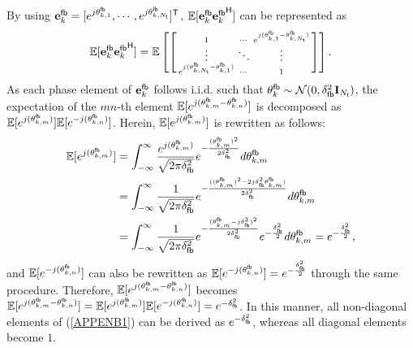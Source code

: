 \documentclass[draftclsnofoot, onecolumn, comsoc, 12pt]{IEEEtran}
\begin{document}
By using ${\mathbf{e}_{k}^{\sf{fb}}} = [e^{j\theta_{k,1}^{\sf{fb}}}, \cdots, e^{j\theta_{k, N_{{\sf{t}}}}^{\sf{fb}}}]^{\sf{T}}$, $\mathbb{E}[{\mathbf{e}_{k}^{\sf{fb}}}{\mathbf{e}_{k}^{\sf{fb}}}^{\sf{H}}]$ can be represented as
\begin{align} \label{APPENB1}
   \mathbb{E}[{\mathbf{e}_{k}^{\sf{fb}}}{\mathbf{e}_{k}^{\sf{fb}}}^{\sf{H}}] = \mathbb{E}\left[
   \left[\begin{smallmatrix}
   1&\cdots&e^{j(\theta_{k, 1}^{\sf{fb}}-\theta_{k, N_{{\sf{t}}}}^{\sf{fb}})} \\ 
   \vdots&\ddots&\vdots\\
   e^{j(\theta_{k, N_{{\sf{t}}}}^{\sf{fb}}-\theta_{k, 1}^{\sf{fb}})}&\cdots&1
   \end{smallmatrix}\right]
   \right].
\end{align}
As each phase element of ${\mathbf{e}_{k}^{\sf{fb}}}$ follows i.i.d. such that $\mathbf{\theta}_{k}^{\sf{fb}}\sim\mathcal{N}{(0,\delta_{\sf{fb}}^{2} \mathbf{I}_{N_{\sf{t}}})}$, the expectation of the $mn$-th element $\mathbb{E}[e^{j(\theta_{k, m}^{\sf{fb}}-\theta_{k, n}^{\sf{fb}})}]$ is decomposed as $\mathbb{E}[e^{j(\theta_{k, m}^{\sf{fb}})}]\mathbb{E}[e^{-j(\theta_{k, n}^{\sf{fb}})}]$. Herein, $\mathbb{E}[e^{j(\theta_{k, m}^{\sf{fb}})}]$ is rewritten as follows:
\begin{align} \label{APPENB2}
  \mathbb{E}[e^{j(\theta_{k, m}^{\sf{fb}})}] &= \int_{-\infty}^{\infty}{\frac{e^{j(\theta_{k, m}^{\sf{fb}})}}{\sqrt{2\pi\delta_{\sf{fb}}^{2}}}}{e^{-\frac{(\theta_{k, m}^{\sf{fb}})^2}{2\delta_{\sf{fb}}^{2}}}}{d\theta_{k, m}^{\sf{fb}}}  \\ 
  &= \int_{-\infty}^{\infty}{\frac{1}{\sqrt{2\pi\delta_{\sf{fb}}^{2}}}}{e^{-\frac{((\theta_{k, m}^{\sf{fb}})^2-2j\delta_{\sf{fb}}^{2}\theta_{k, m}^{\sf{fb}})}{2\delta_{\sf{fb}}^{2}}}}{d\theta_{k, m}^{\sf{fb}}} \nonumber \\
  &= \int_{-\infty}^{\infty}{\frac{1}{\sqrt{2\pi\delta_{\sf{fb}}^{2}}}}{e^{-\frac{(\theta_{k, m}^{\sf{fb}}-j\delta_{\sf{fb}}^{2})^2}{2\delta_{\sf{fb}}^{2}}}}{e^{-\frac{\delta_{\sf{fb}}^{2}}{2}}}{d\theta_{k, m}^{\sf{fb}}} = {e^{-\frac{\delta_{\sf{fb}}^{2}}{2}}},\nonumber
\end{align}
and $\mathbb{E}[e^{-j(\theta_{k, n}^{\sf{fb}})}]$ can also be rewritten as $\mathbb{E}[e^{-j(\theta_{k, n}^{\sf{fb}})}]=e^{-\frac{\delta_{\sf{fb}}^{2}}{2}}$ through the same procedure. 
Therefore, $\mathbb{E}[e^{j(\theta_{k, m}^{\sf{fb}}-\theta_{k, n}^{\sf{fb}})}]$ becomes $\mathbb{E}[e^{j(\theta_{k, m}^{\sf{fb}}-\theta_{k, n}^{\sf{fb}})}]=\mathbb{E}[e^{j(\theta_{k, m}^{\sf{fb}})}]\mathbb{E}[e^{-j(\theta_{k, n}^{\sf{fb}})}] = e^{-\delta_{\sf{fb}}^{2}}$. In this manner, all non-diagonal elements of (\ref{APPENB1}) can be derived as $e^{-\delta_{\sf{fb}}^{2}}$, whereas all diagonal elements become $1$. 
\end{document}
